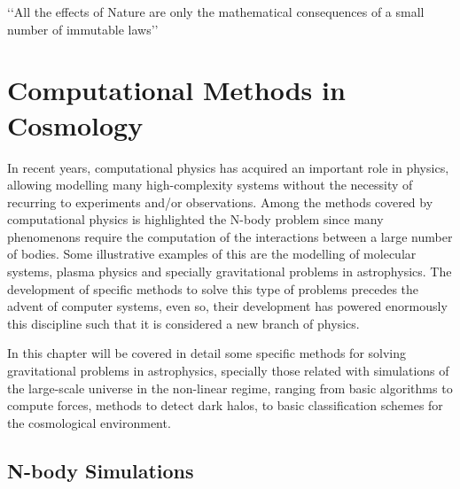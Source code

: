 \begin{savequote}[50mm]
‘‘All the effects of Nature are only the mathematical consequences of a 
small number of immutable laws’’
\end{savequote}




\chapter{Computational Methods in Cosmology}
\label{cha:N-BodySimulations}


In recent years, computational physics has acquired an important role in
physics, allowing modelling many high-complexity systems without the
necessity of recurring to experiments and/or observations. Among the methods
covered by computational physics is highlighted the N-body problem since 
many phenomenons require the computation of the interactions between a
large number of bodies. Some illustrative examples of this are the 
modelling of molecular systems, plasma physics and specially gravitational
problems in astrophysics. The development of specific methods to solve 
this type of problems precedes the advent of computer systems, even so, 
their development has powered enormously this discipline such that it is
considered a new branch of physics.


In this chapter will be covered in detail some specific methods for solving
gravitational problems in astrophysics, specially those related with 
simulations of the large-scale universe in the non-linear regime, ranging 
from basic algorithms to compute forces, methods to detect dark halos, to
basic classification schemes for the cosmological environment.

 





\section{N-body Simulations}
\label{sec:N-bodySimulations}


